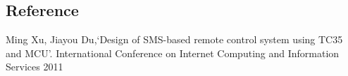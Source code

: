 \begin{center}
\section{Reference}
\end{center}
\begin{enumerate}[{[}1{]}]
\item Ming Xu, Jiayou Du,\lq Design of SMS-based remote control system using TC35 and
MCU\rq . International Conference on Internet Computing and Information Services
2011



\end{enumerate}
